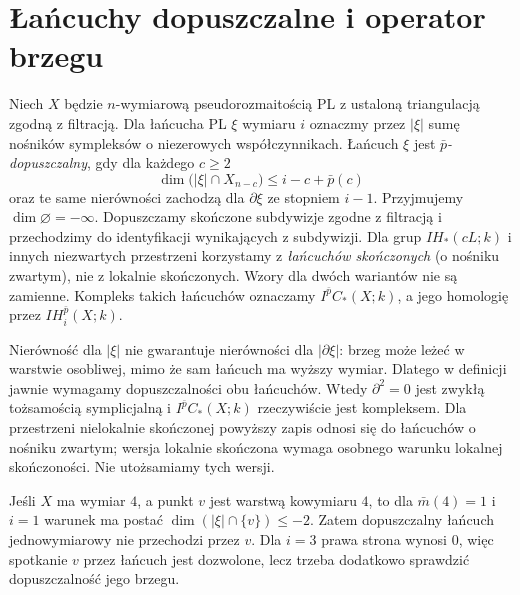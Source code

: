 \section{Łańcuchy dopuszczalne i operator brzegu}
\begin{definicja}[Dopuszczalność]
\label{def:allowability-xiii}
Niech $X$ będzie $n$-wymiarową pseudorozmaitością PL
z ustaloną triangulacją zgodną z filtracją.
Dla łańcucha PL $\xi$ wymiaru $i$ oznaczmy przez
$|\xi|$ sumę nośników sympleksów o niezerowych
współczynnikach. Łańcuch $\xi$ jest
\emph{$\bar p$-dopuszczalny}, gdy dla każdego $c\ge2$
\[
\dim\bigl(|\xi|\cap X_{n-c}\bigr)
\le i-c+\bar p(c)
\]
oraz te same nierówności zachodzą dla $\partial\xi$
ze stopniem $i-1$. Przyjmujemy
$\dim\varnothing=-\infty$. Dopuszczamy skończone
subdywizje zgodne z filtracją i przechodzimy do
identyfikacji wynikających z subdywizji.
Dla grup $IH_*(cL;k)$ i innych niezwartych przestrzeni
korzystamy z \emph{łańcuchów skończonych}
(o nośniku zwartym), nie z lokalnie skończonych.
Wzory dla dwóch wariantów nie są zamienne.
Kompleks takich łańcuchów oznaczamy
$I^{\bar p}C_*(X;k)$, a jego homologię przez
$IH_i^{\bar p}(X;k)$.
\end{definicja}
\begin{uwaga}
Nierówność dla $|\xi|$ nie gwarantuje nierówności
dla $|\partial\xi|$: brzeg może leżeć w warstwie
osobliwej, mimo że sam łańcuch ma wyższy wymiar.
Dlatego w definicji jawnie wymagamy dopuszczalności
obu łańcuchów. Wtedy $\partial^2=0$ jest zwykłą
tożsamością symplicjalną i
$I^{\bar p}C_*(X;k)$ rzeczywiście jest kompleksem.
Dla przestrzeni nielokalnie skończonej powyższy zapis
odnosi się do łańcuchów o nośniku zwartym;
wersja lokalnie skończona wymaga osobnego warunku
lokalnej skończoności. Nie utożsamiamy tych wersji.
\end{uwaga}
\begin{przyklad}
Jeśli $X$ ma wymiar $4$, a punkt $v$ jest warstwą
kowymiaru $4$, to dla $\bar m(4)=1$ i $i=1$
warunek ma postać $\dim(|\xi|\cap\{v\})\le-2$.
Zatem dopuszczalny łańcuch jednowymiarowy nie
przechodzi przez $v$. Dla $i=3$ prawa strona wynosi
$0$, więc spotkanie $v$ przez łańcuch jest dozwolone,
lecz trzeba dodatkowo sprawdzić dopuszczalność jego brzegu.
\end{przyklad}

